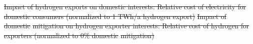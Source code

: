 \documentclass[5p,numafflabel]{elsarticle}
\newcommand{\co}{\ce{CO2}~}
\def\co{CO${}_2${\:}}
\providecommand{\DIFdeltex}[1]{{\protect\color{red}\sout{#1}}}                      %
\providecommand{\DIFdelFL}[1]{\DIFdel{#1}} %
\providecommand{\DIFdel}[1]{\texorpdfstring{\DIFdeltex{#1}}{}} %
\begin{document}
{%
\DIFdelFL{Impact of hydrogen exports on domestic interests:        
        Relative cost of electricity for domestic consumers (normalized to 1 TWh/a hydrogen export)}}
{%
\DIFdelFL{Impact of domestic }%
\DIFdelFL{mitigation on hydrogen exporter interests:   
        Relative cost of hydrogen for exporters (normalized to 0\% domestic }%
\DIFdelFL{mitigation)}}
\end{document}
